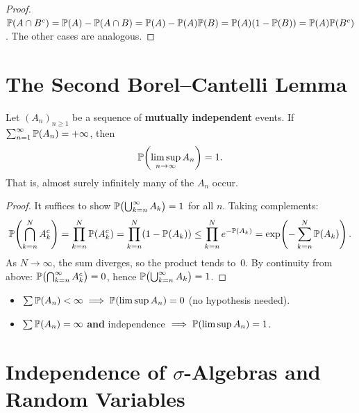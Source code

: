 \begin{proof}
$\mathbb{P}(A \cap B^c) = \mathbb{P}(A) - \mathbb{P}(A \cap B) = \mathbb{P}(A) - \mathbb{P}(A)\mathbb{P}(B)
= \mathbb{P}(A)(1 - \mathbb{P}(B)) = \mathbb{P}(A)\mathbb{P}(B^c)$.
The other cases are analogous.
\end{proof}

\section{The Second Borel--Cantelli Lemma}

\begin{theorem}
\label{thm:borel_cantelli_2}
Let $(A_n)_{n \geq 1}$ be a sequence of \textbf{mutually independent} events.
If $\sum_{n=1}^{\infty} \mathbb{P}(A_n) = +\infty$, then
\[
    \mathbb{P}\!\left(\limsup_{n \to \infty} A_n\right) = 1.
\]
That is, almost surely infinitely many of the $A_n$ occur.
\end{theorem}

\begin{proof}
It suffices to show $\mathbb{P}\bigl(\bigcup_{k=n}^{\infty} A_k\bigr) = 1$ for all $n$.
Taking complements:
\[
    \mathbb{P}\!\left(\bigcap_{k=n}^{N} A_k^c\right)
    = \prod_{k=n}^{N} \mathbb{P}(A_k^c)
    = \prod_{k=n}^{N} (1 - \mathbb{P}(A_k))
    \leq \prod_{k=n}^{N} e^{-\mathbb{P}(A_k)}
    = \exp\!\left(-\sum_{k=n}^{N} \mathbb{P}(A_k)\right).
\]
As $N \to \infty$, the sum diverges, so the product tends to~0. By continuity
from above: $\mathbb{P}\bigl(\bigcap_{k=n}^{\infty} A_k^c\bigr) = 0$, hence
$\mathbb{P}\bigl(\bigcup_{k=n}^{\infty} A_k\bigr) = 1$.
\end{proof}

\begin{keyformulas}[title=\textbf{Summary: Borel--Cantelli}]
\begin{itemize}
    \item $\sum \mathbb{P}(A_n) < \infty \implies \mathbb{P}(\limsup A_n) = 0$ \quad (no hypothesis needed).
    \item $\sum \mathbb{P}(A_n) = \infty$ \textbf{and} independence
          $\implies \mathbb{P}(\limsup A_n) = 1$.
\end{itemize}
\end{keyformulas}

\section{Independence of $\sigma$-Algebras and Random Variables}

